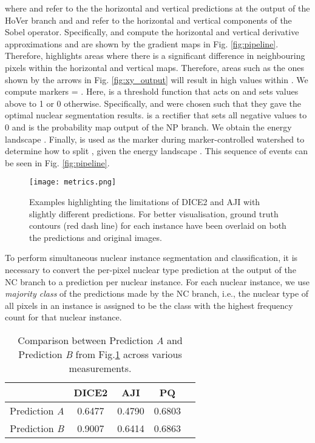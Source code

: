 \documentclass[journal]{IEEEtran}
\begin{document}
	where  and  refer to the the horizontal and vertical predictions at the output of the HoVer branch and  and  refer to the horizontal and vertical components of the Sobel operator. Specifically,  and  compute the horizontal and vertical derivative approximations and are shown by the gradient maps in Fig. \ref{fig:pipeline}. Therefore,  highlights areas where there is a significant difference in neighbouring pixels within the horizontal and vertical maps. Therefore, areas such as the ones shown by the arrows in Fig. \ref{fig:xy_output} will result in high values within . We compute markers  = . Here,  is a threshold function that acts on  and sets values above  to 1 or 0 otherwise. Specifically,  and  were chosen such that they gave the optimal nuclear segmentation results.  is a rectifier that sets all negative values to 0 and  is the probability map output of the NP branch. We obtain the energy landscape . Finally,  is used as the marker during marker-controlled watershed to determine how to split , given the energy landscape . This sequence of events can be seen in Fig. \ref{fig:pipeline}.
	
			\begin{figure}[!t]
		\centering
        \texttt{[image: metrics.png]}
		\caption{Examples highlighting the limitations of DICE2 and AJI with slightly different predictions. For better visualisation, ground truth contours (red dash line) for each instance have been overlaid on both the predictions and original images.} 
		\label{fig:dice2_aji_problem}
	\end{figure}
	
	
	To perform simultaneous nuclear instance segmentation and classification, it is necessary to convert the per-pixel nuclear type prediction at the output of the NC branch to a prediction per nuclear instance. For each nuclear instance, we use {\em majority class} of the predictions made by the NC branch, i.e., the nuclear type of all pixels in an instance is assigned to be the class with the highest frequency count for that nuclear instance.
	
	   \begin{table}[!t]
	\begin{center}
		\caption{Comparison between Prediction \textit{A} and Prediction \textit{B} from Fig.\ref{fig:dice2_aji_problem} across various measurements.}
		\setlength{\tabcolsep}{6pt} \renewcommand{\arraystretch}{1.0} \label{table:metrics_toy_results}
		\begin{tabular}{c|cccc}
			& \textbf{DICE2} & \textbf{AJI} & \textbf{PQ} \\
			\midrule
            Prediction \textit{A} & 0.6477 & 0.4790 & 0.6803 \\
            Prediction \textit{B} & 0.9007 & 0.6414 & 0.6863 \\
			\bottomrule
		\end{tabular}
	\end{center}
	\end{table}	
	
\end{document}
